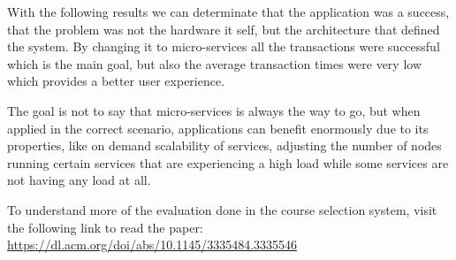 \documentclass[14pt]{extarticle}
\begin{document}
With the following results we can determinate that the application was a success, that the problem was not the hardware it self, but the architecture that defined the system. By changing it to micro-services all the transactions were successful which is the main goal, but also the average transaction times were very low which provides a better user experience.

The goal is not to say that micro-services is always the way to go, but when applied in the correct scenario, applications can benefit enormously due to its properties, like on demand scalability of services, adjusting the number of nodes running certain services that are experiencing a high load while some services are not having any load at all.

To understand more of the evaluation done in the course selection system, visit the following link to read the paper: \url{https://dl.acm.org/doi/abs/10.1145/3335484.3335546}
\end{document}

